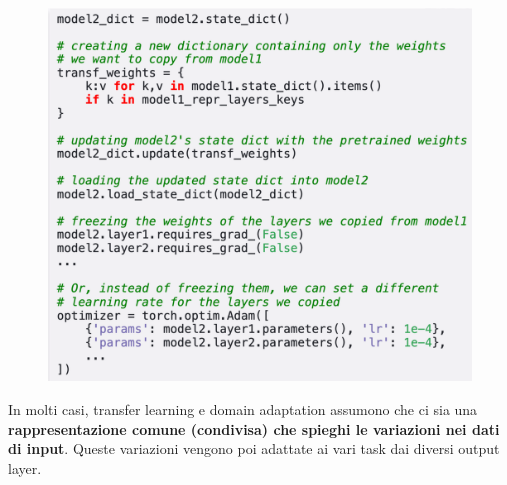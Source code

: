 \begin{figure}[!h]
  \includegraphics[scale=.5]{images/representation_learning/pytorch.png}
  \centering
\end{figure}

\newpage
In molti casi, transfer learning e domain adaptation assumono che ci sia una 
\textbf{rappresentazione comune (condivisa) che spieghi le variazioni nei dati di input}. Queste variazioni
vengono poi adattate ai vari task dai diversi output layer.


